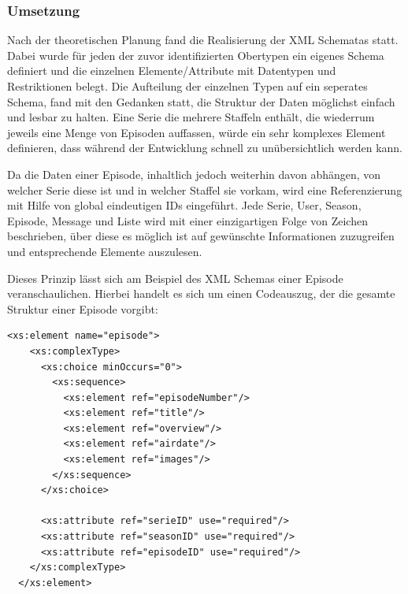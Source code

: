\newpage

\subsubsection{Umsetzung}

Nach der theoretischen Planung fand die Realisierung der XML Schematas statt.
Dabei wurde für jeden der zuvor identifizierten Obertypen ein eigenes Schema definiert und die einzelnen Elemente/Attribute mit Datentypen und Restriktionen belegt. Die Aufteilung der einzelnen Typen auf ein seperates Schema, fand mit den Gedanken statt, die Struktur der Daten möglichst einfach und lesbar zu halten. Eine Serie die mehrere Staffeln enthält, die wiederrum jeweils eine Menge von Episoden auffassen, würde ein sehr komplexes Element definieren, dass während der Entwicklung schnell zu unübersichtlich werden kann.

Da die Daten einer Episode, inhaltlich jedoch weiterhin davon abhängen, von welcher Serie diese ist und in welcher Staffel sie vorkam, wird eine Referenzierung mit Hilfe von global eindeutigen IDs eingeführt. Jede Serie, User, Season, Episode, Message und Liste wird mit einer einzigartigen Folge von Zeichen beschrieben, über diese es möglich ist auf gewünschte Informationen zuzugreifen und entsprechende Elemente auszulesen.

Dieses Prinzip lässt sich am Beispiel des XML Schemas einer Episode veranschaulichen. Hierbei handelt es sich um einen Codeauszug, der die gesamte Struktur einer Episode vorgibt:
\begin{lstlisting}[label=xsd-definition,caption= Definition des complexElement Episode mit Elementen und Attributen]
  <xs:element name="episode">
    <xs:complexType>
      <xs:choice minOccurs="0">
        <xs:sequence>
          <xs:element ref="episodeNumber"/>
          <xs:element ref="title"/>
          <xs:element ref="overview"/>
          <xs:element ref="airdate"/>
          <xs:element ref="images"/>
        </xs:sequence>
      </xs:choice>

      <xs:attribute ref="serieID" use="required"/>
      <xs:attribute ref="seasonID" use="required"/>
      <xs:attribute ref="episodeID" use="required"/>
    </xs:complexType>
  </xs:element>
\end{lstlisting}

